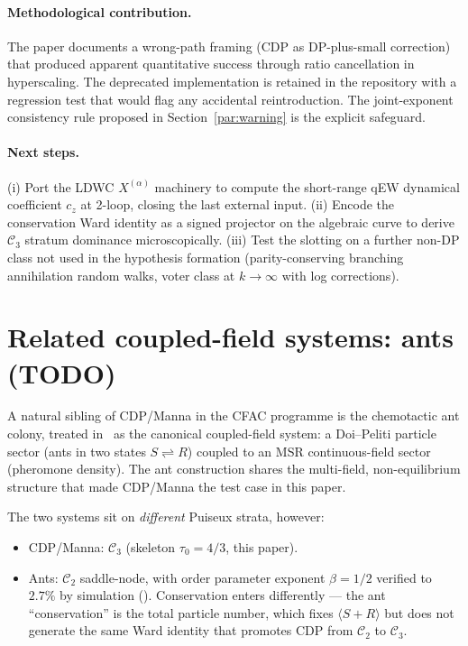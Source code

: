 \documentclass[10pt,a4paper,twocolumn]{article}
\theoremstyle{plain}
\theoremstyle{definition}
\newcommand{\Cstr}[1]{\mathcal{C}_{#1}}
\begin{document}
\paragraph{Methodological contribution.}
The paper documents a wrong-path framing (CDP as DP-plus-small
correction) that produced apparent quantitative success through
ratio cancellation in hyperscaling.  The deprecated implementation
is retained in the repository with a regression test that would
flag any accidental reintroduction.  The joint-exponent
consistency rule proposed in Section~\ref{par:warning} is the
explicit safeguard.

\paragraph{Next steps.}
(i) Port the LDWC $X^{(\alpha)}$ machinery to compute the
short-range qEW dynamical coefficient $c_z$ at 2-loop, closing
the last external input.
(ii) Encode the conservation Ward identity as a signed projector
on the algebraic curve to derive $\Cstr{3}$ stratum dominance
microscopically.
(iii) Test the slotting on a further non-DP class not used in the
hypothesis formation (parity-conserving branching annihilation
random walks, voter class at $k \to \infty$ with log
corrections).

\appendix
\section{Related coupled-field systems: ants (TODO)}
\label{app:ants}

A natural sibling of CDP/Manna in the CFAC programme is the
chemotactic ant colony, treated in~\citep{AmarteifioAnts2026} as the
canonical coupled-field system: a Doi--Peliti particle sector
(ants in two states $S \rightleftharpoons R$) coupled to an
MSR continuous-field sector (pheromone density).  The ant
construction shares the multi-field, non-equilibrium structure that
made CDP/Manna the test case in this paper.

The two systems sit on \emph{different} Puiseux strata, however:
\begin{itemize}[leftmargin=1.2em,itemsep=1pt]
  \item CDP/Manna: $\Cstr{3}$ (skeleton $\tau_0 = 4/3$, this paper).
  \item Ants: $\Cstr{2}$ saddle-node, with order parameter
    exponent $\beta = 1/2$ verified to $2.7\%$ by simulation
    (\citep[\S 4]{AmarteifioAnts2026}).  Conservation enters
    differently --- the ant ``conservation'' is the total particle
    number, which fixes $\langle S + R\rangle$ but does not generate
    the same Ward identity that promotes CDP from $\Cstr{2}$ to
    $\Cstr{3}$.
\end{itemize}
\end{document}
